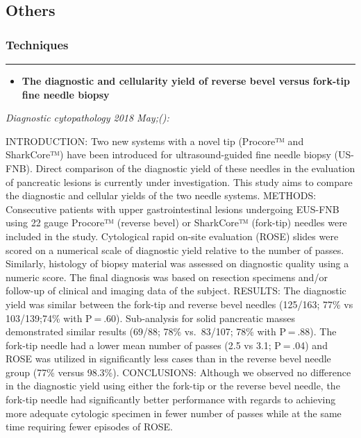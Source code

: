\documentclass[]{article}
\providecommand{\tightlist}{%
  \setlength{\itemsep}{0pt}\setlength{\parskip}{0pt}}
\begin{document}
\hypertarget{others}{%
\subsection{Others}\label{others}}

\hypertarget{techniques}{%
\subsubsection{Techniques}\label{techniques}}

\begin{center}\rule{0.5\linewidth}{\linethickness}\end{center}

\begin{itemize}
\tightlist
\item
  \textbf{The diagnostic and cellularity yield of reverse bevel versus
  fork-tip fine needle biopsy}
\end{itemize}

\emph{Diagnostic cytopathology 2018 May;():}

INTRODUCTION: Two new systems with a novel tip (Procore™ and SharkCore™)
have been introduced for ultrasound-guided fine needle biopsy (US-FNB).
Direct comparison of the diagnostic yield of these needles in the
evaluation of pancreatic lesions is currently under investigation. This
study aims to compare the diagnostic and cellular yields of the two
needle systems. METHODS: Consecutive patients with upper
gastrointestinal lesions undergoing EUS-FNB using 22 gauge Procore™
(reverse bevel) or SharkCore™ (fork-tip) needles were included in the
study. Cytological rapid on-site evaluation (ROSE) slides were scored on
a numerical scale of diagnostic yield relative to the number of passes.
Similarly, histology of biopsy material was assessed on diagnostic
quality using a numeric score. The final diagnosis was based on
resection specimens and/or follow-up of clinical and imaging data of the
subject. RESULTS: The diagnostic yield was similar between the fork-tip
and reverse bevel needles (125/163; 77\% vs 103/139;74\% with P = .60).
Sub-analysis for solid pancreatic masses demonstrated similar results
(69/88; 78\% vs.~83/107; 78\% with P = .88). The fork-tip needle had a
lower mean number of passes (2.5 vs 3.1; P = .04) and ROSE was utilized
in significantly less cases than in the reverse bevel needle group (77\%
versus 98.3\%). CONCLUSIONS: Although we observed no difference in the
diagnostic yield using either the fork-tip or the reverse bevel needle,
the fork-tip needle had significantly better performance with regards to
achieving more adequate cytologic specimen in fewer number of passes
while at the same time requiring fewer episodes of ROSE.
\end{document}
